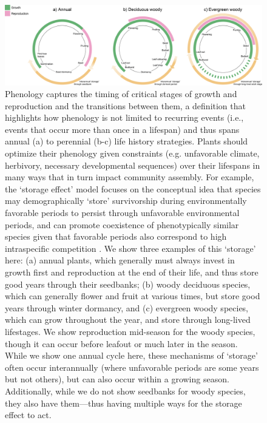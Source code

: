 \documentclass[11pt]{article}
\begin{document}
\begin{figure}[h!]
\centering
\includegraphics[width=1\textwidth]{..//figures/figsubmit/phenologyCirclesStorage.png}
\caption{Phenology captures the timing of critical stages of growth and reproduction and the transitions between them, a definition that highlights how phenology is not limited to recurring events (i.e., events that occur more than once in a lifespan) and thus spans annual (a) to perennial (b-c) life history strategies.  Plants should optimize their phenology given constraints (e.g. unfavorable climate, herbivory, necessary developmental sequences) over their lifespans in many ways that in turn impact community assembly. For example, the `storage effect' model focuses on the conceptual idea that species may demographically  `store' survivorship during environmentally favorable periods to persist through unfavorable environmental periods, and can promote coexistence of phenotypically similar species given that favorable periods also correspond to high intraspecific competition \citep[][and see text for more details]{Chesson:2000vd}. We show three examples of this `storage' here: (a) annual plants, which generally must always invest in growth first and reproduction at the end of their life, and thus store good years through their seedbanks; (b) woody deciduous species, which can generally flower and fruit at various times, but store good years through winter dormancy, and (c) evergreen woody species, which can grow throughout the year, and store through long-lived lifestages. We show reproduction mid-season for the woody species, though it can occur before leafout or much later in the season. While we show one annual cycle here, these mechanisms of `storage' often occur interannually (where unfavorable periods are some years but not others), but can also occur within a growing season. Additionally, while we do not show seedbanks for woody species, they also have them---thus having multiple ways for the storage effect to act.}
 \label{fig:phenologycircles}
\end{figure}

\clearpage
\end{document}
